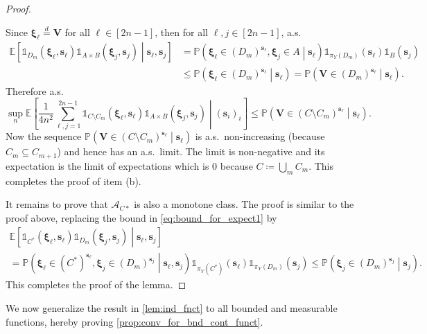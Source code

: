 \documentclass[11pt,a4paper,oneside]{article}
\theoremstyle{definition}
\theoremstyle{remark}
\def\E{\mathbb{E}}
\def\P{\mathbb{P}}
\begin{document}
\begin{proof}
\begin{itemize}
Since  $\bm \xi_\ell\stackrel{d}{=}\bm V$ for all $\ell\in[2n-1]$, then for all $\ell,j\in[2n-1]$, a.s.
\begin{align}
\E\left[\mathds{1}_{D_m}\left(\bm \xi_\ell,\bm s_\ell\right)\mathds{1}_{A\times B}\left(\bm \xi_j,\bm s_j\right)\middle| \bm s_\ell,\bm s_j\right]
&=\P\left(\bm \xi_\ell\in (D_m)^{\bm s_\ell},\bm \xi_j\in A\middle| \bm s_\ell\right)\mathds{1}_{\pi_Y(D_m)}(\bm s_\ell)\mathds{1}_{B}(\bm s_j)\\
&\leq \P\left(\bm \xi_\ell\in (D_m)^{\bm s_\ell}\middle| \bm s_\ell\right)=\P\left(\bm V\in (D_m)^{\bm s_\ell}\middle| \bm s_\ell\right).\label{eq:bound_for_expect1}
\end{align}
Therefore a.s.
\begin{equation}\label{eq:bnd_for_exp}
\sup_{n}\E\left[\frac{1}{4n^2}\sum_{\ell,j=1}^{2n-1}\mathds{1}_{C\setminus C_m}\left(\bm \xi_\ell,\bm s_\ell\right)\mathds{1}_{A\times B}\left(\bm \xi_j,\bm s_j\right)\middle| ( \bm s_i)_i\right]
\leq\P\left(\bm V\in (C\setminus C_m)^{\bm s_\ell}\middle| \bm s_\ell\right).
\end{equation}
Now the sequence $\P\left(\bm V\in (C\setminus C_m)^{\bm s_\ell}\middle| \bm s_\ell\right)$ is a.s.\ non-increasing (because  $C_m \subseteq C_{m+1}$) and hence has an a.s.\ limit. The limit is non-negative and its expectation is the limit of expectations which is $0$ because  $C\coloneqq\bigcup_m C_m$. This completes the proof of item (b).
\end{itemize}


It remains to prove that $\mathcal{A}_{C*}$ is also a monotone class.
The proof is similar to the proof above, replacing the bound in \cref{eq:bound_for_expect1} by
\begin{multline}\label{eq:bound_for_expect2}
\E\left[\mathds{1}_{C^*}\left(\bm \xi_\ell,\bm s_\ell\right)\mathds{1}_{D_m}\left(\bm \xi_j,\bm s_j\right)\middle| \bm s_\ell,\bm s_j\right]\\
=\P\left(\bm \xi_\ell\in (C^*)^{\bm s_\ell},\bm \xi_j\in (D_m)^{\bm s_j}\middle| \bm s_\ell,\bm s_j\right)\mathds{1}_{\pi_Y(C^*)}(\bm s_\ell)\mathds{1}_{\pi_Y(D_m)}(\bm s_j)
\leq \P\left(\bm \xi_j\in (D_m)^{\bm s_j}\middle|\bm s_j\right).
\end{multline}
This completes the proof of the lemma.
\end{proof}

We now generalize the result in \cref{lem:ind_fnct} to all bounded and measurable functions, hereby proving \cref{prop:conv_for_bnd_cont_funct}.
\end{document}
